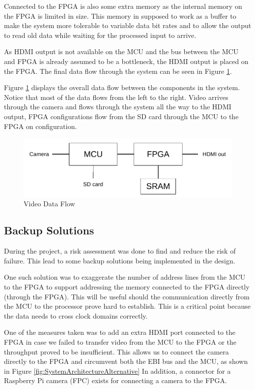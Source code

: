Connected to the FPGA is also some extra memory as the internal memory on the FPGA is limited in size.
This memory in supposed to work as a buffer to make the system more tolerable to variable data bit rates and to allow the output to read old data while waiting for the processed input to arrive.

As HDMI output is not available on the MCU and the bus between the MCU and FPGA is already assumed to be a bottleneck, the HDMI output is placed on the FPGA.
The final data flow through the system can be seen in Figure \ref{fig:SystemArchitecture}.

Figure \ref{fig:SystemArchitecture} displays the overall data flow between the components in the system.
Notice that most of the data flows from the left to the right. Video arrives through the camera and flows through the system all the way to the HDMI output, FPGA configurations flow from the SD card through the MCU to the FPGA on configuration.

\begin{figure}
    \includegraphics{img/SystemArchitecture}
    \caption{Video Data Flow}
    \label{fig:SystemArchitecture}
\end{figure}

\subsection{Backup Solutions} \label{subsec:RiskAssessment}
During the project, a risk assessment was done to find and reduce the risk of failure.
This lead to some backup solutions being implemented in the design.

One such solution was to exaggerate the number of address lines from the MCU to the FPGA to support addressing the memory connected to the FPGA directly (through the FPGA).
This will be useful should the communication directly from the MCU to the processor prove hard to establish.
This is a critical point because the data needs to cross clock domains correctly.

One of the measures taken was to add an extra HDMI port connected to the FPGA in case we failed to transfer video from the MCU to the FPGA or the throughput proved to be insufficient.
This allows us to connect the camera directly to the FPGA and circumvent both the EBI bus and the MCU, as shown in Figure \ref{fig:SystemArchitectureAlternative}
In addition, a connector for a Raspberry Pi camera (FPC) exists for connecting a camera to the FPGA.

